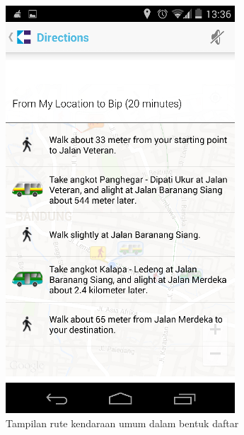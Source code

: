 \begin{figure}[h]
	\centering
		\includegraphics[scale=0.5]{Gambar/KIRI_Android/tampilan_daftar}
	\caption{Tampilan rute kendaraan umum dalam bentuk daftar}
	\label{fig:daftar}
\end{figure}

